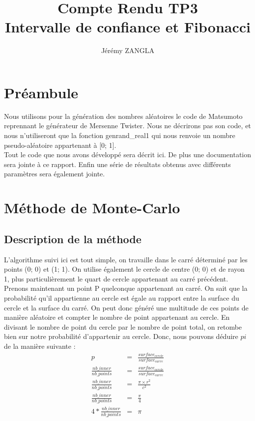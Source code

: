 \documentclass[a4paper]{article}
\title{Compte Rendu TP3\\Intervalle de confiance et Fibonacci}
\author{Jérémy ZANGLA}
\begin{document}
\maketitle
\pagebreak
\tableofcontents
\pagebreak
\section{Préambule}
	Nous utilisons pour la génération des nombres aléatoires le code de Matsumoto reprennant le générateur de Mersenne Twister. Nous ne décrirons pas son code, et nous n'utiliseront que la fonction genrand\_real1 qui nous renvoie un nombre pseudo-aléatoire appartenant à [0; 1].
	\\
	Tout le code que nous avons développé sera décrit ici. De plus une documentation sera jointe à ce rapport. Enfin une série de résultats obtenus avec différents paramètres sera également jointe.
\section{Méthode de Monte-Carlo}
\subsection{Description de la méthode}
L'algorithme suivi ici est tout simple, on travaille dans le carré déterminé par les points (0; 0) et (1; 1). 
On utilise également le cercle de centre (0; 0) et de rayon 1, plus particulièrement le quart de cercle appartenant au carré précédent.
Prenons maintenant un point P quelconque appartenant au carré. On sait que la probabilité qu'il appartienne au cercle est égale au rapport entre la surface du cercle et la surface du carré.
On peut donc généré une multitude de ces points de manière aléatoire et compter le nombre de point appartenant au cercle. En divisant le nombre de point du cercle par le nombre de point total, on retombe bien sur notre probabilité d'appartenir au cercle.
Donc, nous pouvons déduire $pi$ de la manière suivante :
\begin{eqnarray*}
	p &=& \frac{surface_{cercle}}{surface_{carre}} \\
	\frac{nb\_inner}{nb\_points}  &=& \frac{surface_{cercle}}{surface_{carre}} \\
	\frac{nb\_inner}{nb\_points}  &=& \frac{\pi \times r^2}{c^2} \\
	\frac{nb\_inner}{nb\_points}  &=& \frac{\pi}{4} \\
	4*\frac{nb\_inner}{nb\_points}  &=& \pi \\
\end{eqnarray*}
\end{document}
